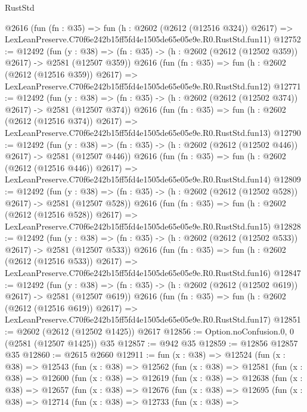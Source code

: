 \begin{lexlean}{RustStd}
\begin{coremodule}
    @2616
    (fun (fn : @35) =>
    fun (h : @2602 (@2612 (@12516 @324)) @2617) =>
    LexLeanPreserve.C70f6e242b15ff5fd4e1505de65e05e9e.R0.RustStd.fun11)
@12752 := @12492
    (fun (y : @38) => (fn : @35) -> (h : @2602 (@2612 (@12502 @359)) @2617) -> @2581 (@12507 @359))
    @2616
    (fun (fn : @35) =>
    fun (h : @2602 (@2612 (@12516 @359)) @2617) =>
    LexLeanPreserve.C70f6e242b15ff5fd4e1505de65e05e9e.R0.RustStd.fun12)
@12771 := @12492
    (fun (y : @38) => (fn : @35) -> (h : @2602 (@2612 (@12502 @374)) @2617) -> @2581 (@12507 @374))
    @2616
    (fun (fn : @35) =>
    fun (h : @2602 (@2612 (@12516 @374)) @2617) =>
    LexLeanPreserve.C70f6e242b15ff5fd4e1505de65e05e9e.R0.RustStd.fun13)
@12790 := @12492
    (fun (y : @38) => (fn : @35) -> (h : @2602 (@2612 (@12502 @446)) @2617) -> @2581 (@12507 @446))
    @2616
    (fun (fn : @35) =>
    fun (h : @2602 (@2612 (@12516 @446)) @2617) =>
    LexLeanPreserve.C70f6e242b15ff5fd4e1505de65e05e9e.R0.RustStd.fun14)
@12809 := @12492
    (fun (y : @38) => (fn : @35) -> (h : @2602 (@2612 (@12502 @528)) @2617) -> @2581 (@12507 @528))
    @2616
    (fun (fn : @35) =>
    fun (h : @2602 (@2612 (@12516 @528)) @2617) =>
    LexLeanPreserve.C70f6e242b15ff5fd4e1505de65e05e9e.R0.RustStd.fun15)
@12828 := @12492
    (fun (y : @38) => (fn : @35) -> (h : @2602 (@2612 (@12502 @533)) @2617) -> @2581 (@12507 @533))
    @2616
    (fun (fn : @35) =>
    fun (h : @2602 (@2612 (@12516 @533)) @2617) =>
    LexLeanPreserve.C70f6e242b15ff5fd4e1505de65e05e9e.R0.RustStd.fun16)
@12847 := @12492
    (fun (y : @38) => (fn : @35) -> (h : @2602 (@2612 (@12502 @619)) @2617) -> @2581 (@12507 @619))
    @2616
    (fun (fn : @35) =>
    fun (h : @2602 (@2612 (@12516 @619)) @2617) =>
    LexLeanPreserve.C70f6e242b15ff5fd4e1505de65e05e9e.R0.RustStd.fun17)
@12851 := @2602 (@2612 (@12502 @1425)) @2617
@12856 := Option.noConfusion.{0, 0} (@2581 (@12507 @1425)) @35
@12857 := @942 @35
@12859 := @12856 @12857 @35
@12860 := @2615 @2660
@12911 := fun (x : @38) =>
  @12524
    (fun (x : @38) =>
    @12543
      (fun (x : @38) =>
      @12562
        (fun (x : @38) =>
        @12581
          (fun (x : @38) =>
          @12600
            (fun (x : @38) =>
            @12619
              (fun (x : @38) =>
              @12638
                (fun (x : @38) =>
                @12657
                  (fun (x : @38) =>
                  @12676
                    (fun (x : @38) =>
                    @12695
                      (fun (x : @38) =>
                      @12714
                        (fun (x : @38) =>
                        @12733
                          (fun (x : @38) =>

\end{coremodule}
\end{lexlean}
